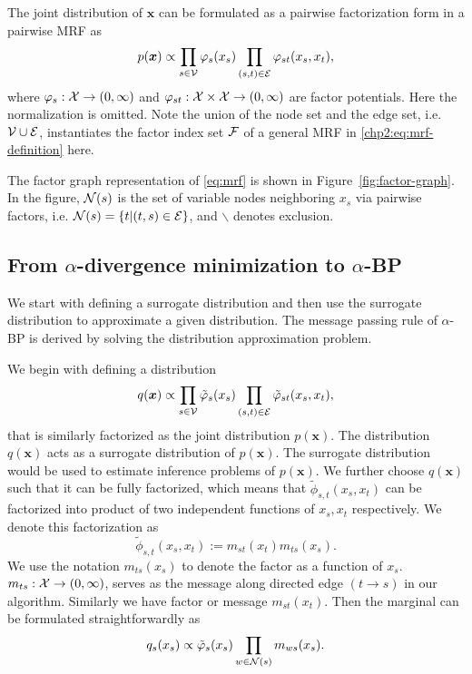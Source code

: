 The joint distribution of $\bm{x}$ can be formulated as a pairwise factorization form in a pairwise MRF as
\begin{equation}\label{eq:mrf}
  p(\bm{x}) \propto \prod_{{s\in \mathcal{V}}} \varphi_s(x_s) \prod_{(s,t) \in \mathcal{E}} \varphi_{st}(x_s, x_t),
\end{equation}
where $\varphi_{s}: \mathcal{X} \rightarrow (0, \infty)$ and $\varphi_{st}: \mathcal{X} \times \mathcal{X} \rightarrow (0, \infty)$ are factor potentials. Here the normalization is omitted. Note the union of the node set and the edge set, i.e. $\mathcal{V} \cup \mathcal{E}$, instantiates the factor index set $\mathcal{F}$ of a general MRF in \eqref{chp2:eq:mrf-definition} here.

The factor graph representation of \eqref{eq:mrf} is shown in
Figure~\ref{fig:factor-graph}. In the figure, $\mathcal{N}(s)$ is the set of variable nodes neighboring $x_s$ via
pairwise factors, i.e. $\mathcal{N}(s) = \left\{ t|(t,s) \in \mathcal{E} \right\}$, and $\backslash$ denotes exclusion.

\subsection{From $\alpha$-divergence minimization to $\alpha$-BP}
We start with defining a surrogate distribution and then use the surrogate distribution to approximate a given distribution. The message passing rule of $\alpha$-BP is derived by solving the distribution approximation problem.

We begin with defining a distribution
\begin{equation}
  q(\bm{x}) \propto \prod_{{s\in \mathcal{V}}} \tilde{\varphi}_s(x_s) \prod_{(s,t) \in \mathcal{E}} \tilde{\varphi}_{st}(x_s, x_t),
\end{equation}
that is similarly factorized as the joint distribution $p(\bm{x})$. The distribution $q(\bm{x})$ acts as a surrogate distribution of $p(\bm{x})$. The surrogate distribution would be used to estimate inference problems of $p(\bm{x})$. We further choose $q(\bm{x})$ such that it can be fully factorized, which means that $\tilde{\phi}_{s,t}(x_s, x_t)$ can be factorized into product of two independent functions of $x_s, x_t$ respectively. We denote this factorization as
\begin{equation}
  \tilde{\phi}_{s,t}(x_s, x_t) := m_{st}(x_t) m_{ts}(x_s).
\end{equation}
We use the notation $m_{ts}(x_s)$ to denote the factor as a function of $x_s$. $m_{ts}: \mathcal{X} \rightarrow (0, \infty)$, serves as the message along directed edge $(t \rightarrow s)$ in our algorithm. Similarly we have factor or message $m_{st}(x_t)$. Then the marginal can be formulated straightforwardly as
\begin{equation}
  q_s(x_s) \propto \tilde{\varphi}_s(x_s) \prod_{w\in \mathcal{N}(s)} m_{ws}(x_s).
\end{equation}

